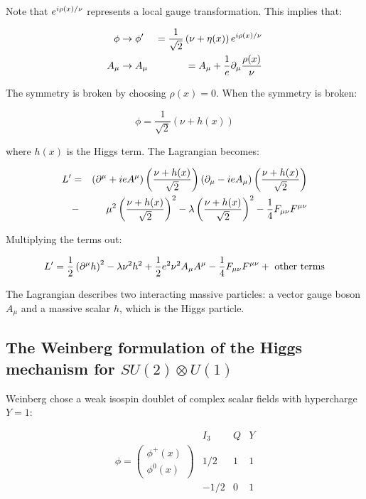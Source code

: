 Note that $e^{i\rho(x)/\nu}$ represents a local gauge transformation.  This implies that:

\begin{eqnarray*}
  \phi & \to \phi' & = \frac{1}{\sqrt{2}}\left(\nu + \eta(x)\right) e^{i\rho(x)/\nu} \\
  A_{\mu} &\to A_{\mu} & = A_{\mu} + \frac{1}{e}\partial_{\mu} \frac{\rho(x)}{\nu}
\end{eqnarray*}

The symmetry is broken by choosing $\rho(x) = 0$.  When the symmetry is broken:

\[
  \phi = \frac{1}{\sqrt{2}}\left(\nu + h(x)\right)
\]

where $h(x)$ is the Higgs term.  The Lagrangian becomes:

\begin{eqnarray*}
  L' & = & \left(\partial^{\mu} + ie A^{\mu}\right)\left(\frac{\nu + h(x)}{\sqrt{2}}\right)\left(\partial_{\mu} - ie A_{\mu}\right)\left(\frac{\nu + h(x)}{\sqrt{2}}\right)\\
  & - & \mu^2\left(\frac{\nu + h(x)}{\sqrt{2}}\right)^2 - \lambda\left(\frac{\nu + h(x)}{\sqrt{2}}\right)^2 - \frac{1}{4}F_{\mu\nu}F^{\mu\nu}
\end{eqnarray*}

Multiplying the terms out:

\[
  L' = \frac{1}{2}\left(\partial^{\mu}h\right)^2 - \lambda\nu^2h^2 + \frac{1}{2}e^2\nu^2A_{\mu}A^{\mu} - \frac{1}{4}F_{\mu\nu}F^{\mu\nu} + \textrm{ other terms}
\]

The Lagrangian describes two interacting massive particles: a vector gauge boson $A_{\mu}$ and a massive scalar $h$, which is the Higgs particle.

\subsection[Weinberg formulation of the Higgs mechanism for \texorpdfstring{$SU(2) \otimes U(1)$}{SU2TimesU1}]{The Weinberg formulation of the Higgs mechanism for \texorpdfstring{$SU(2) \otimes U(1)$}{SU2TimesU1}}

Weinberg chose a weak isospin doublet of complex scalar fields with hypercharge $Y = 1$:

\[
  \begin{array}{cccc}
    &
    I_3 & Q & Y \\
    \phi = 
    \left(
    \begin{array}{c}
      \phi^+(x) \\
      \phi^0(x)
    \end{array}
    \right)
    &
    1/2  & 1 & 1 \\
    & -1/2 & 0 & 1
  \end{array}
\]

